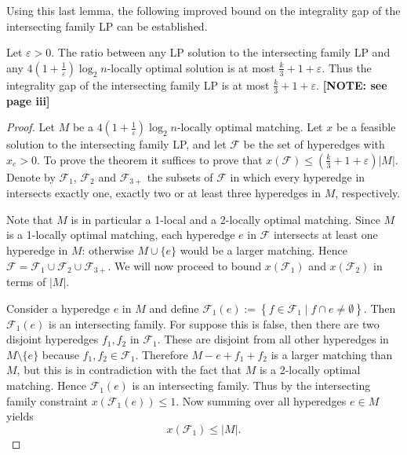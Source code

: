 Using this last lemma, the following improved bound on the integrality gap of the intersecting family LP can be established.
%
\begin{theorem}\label{thm:IntegralityGap2}
Let $\varepsilon > 0$. The ratio between any LP solution to the intersecting family LP and any $4 ( 1 + \frac{1}{\varepsilon} ) \log_2 n$-locally optimal solution is at most $\frac{k}{3} + 1 + \varepsilon$. Thus the integrality gap of the intersecting family LP is at most $\frac{k}{3} + 1 + \varepsilon$. \textbf{[NOTE: see page iii]}
\end{theorem}
%
\begin{proof}
Let $M$ be a $4 ( 1 + \frac{1}{\varepsilon} ) \log_2 n$-locally optimal matching. Let $x$ be a feasible solution to the intersecting family LP, and let $\mathcal{F}$ be the set of hyperedges with $x_e > 0$. To prove the theorem it suffices to prove that $x(\mathcal{F}) \leq \left( \frac{k}{3} + 1 + \varepsilon \right) |M|$. Denote by $\mathcal{F}_1$, $\mathcal{F}_2$ and $\mathcal{F}_{3+}$ the subsets of $\mathcal{F}$ in which every hyperedge in intersects exactly one, exactly two or at least three hyperedges in $M$, respectively.

Note that $M$ is in particular a 1-local and a 2-locally optimal matching. Since $M$ is a 1-locally optimal matching, each hyperedge $e$ in $\mathcal{F}$ intersects at least one hyperedge in $M$: otherwise $M \cup \{e\}$ would be a larger matching. Hence $\mathcal{F} = \mathcal{F}_1 \cup \mathcal{F}_2 \cup \mathcal{F}_{3+}$. We will now proceed to bound $x(\mathcal{F}_1)$ and $x(\mathcal{F}_2)$ in terms of $|M|$.

Consider a hyperedge $e$ in $M$ and define $\mathcal{F}_1(e) := \left\{ f \in \mathcal{F}_1 \mid f \cap e \neq \emptyset \right\}$. Then $\mathcal{F}_1(e)$ is an intersecting family. For suppose this is false, then there are two disjoint hyperedges $f_1, f_2$ in $\mathcal{F}_1$. These are disjoint from all other hyperedges in $M \setminus \{e\}$ because $f_1, f_2 \in \mathcal{F}_1$. Therefore $M - e + f_1 + f_2$ is a larger matching than $M$, but this is in contradiction with the fact that $M$ is a 2-locally optimal matching. Hence $\mathcal{F}_1(e)$ is an intersecting family. Thus by the intersecting family constraint $x(\mathcal{F}_1(e)) \leq 1$. Now summing over all hyperedges $e \in M$ yields
%
\begin{equation}\label{F1}
x(\mathcal{F}_1) \leq |M|.
\end{equation}


\end{proof}
